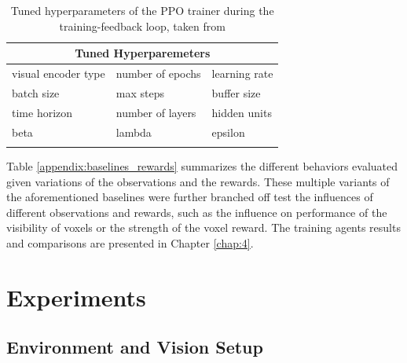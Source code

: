 \begin{longtable}{@{} p{3.5cm} p{3.5cm} p{3.5cm} @{}} \toprule
\multicolumn{3}{c}{Tuned Hyperparemeters}\\ \midrule
visual encoder type         & 
number of epochs                   & 
learning rate               \\ 

batch size                  &  
max steps                   &
buffer size                 \\

time horizon                &
number of layers            &
hidden units                \\

beta                        &
lambda                      &
epsilon                     \\\bottomrule
\caption{Tuned hyperparameters of the PPO trainer during the training-feedback loop, taken from \cite{github-unity-mlagents-toolkit}} \label{tab:trainer-hyperparameters}
\end{longtable} 

Table \ref{appendix:baselines_rewards} summarizes the different behaviors evaluated given variations of the observations and the rewards. These multiple variants of the aforementioned baselines were further branched off test the influences of different observations and rewards, such as the influence on performance of the visibility of voxels or the strength of the voxel reward. The training agents 
results and comparisons are presented in Chapter \ref{chap:4}. 



\section{Experiments}
\subsection{Environment and Vision Setup}\label{chap:4:setup}

